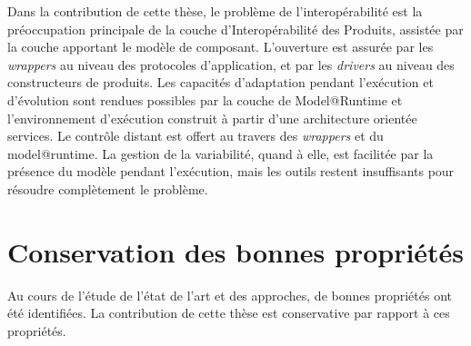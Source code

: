 Dans la contribution de cette thèse, le problème de l'interopérabilité est la préoccupation principale de la couche d'Interopérabilité des Produits, assistée par la couche apportant le modèle de composant. L'ouverture est assurée par les {\it wrappers} au niveau des protocoles d'application, et par les {\it drivers} au niveau des constructeurs de produits. Les capacités d'adaptation pendant l'exécution et d'évolution sont rendues possibles par la couche de Model@Runtime et l'environnement d'exécution construit à partir d'une architecture orientée services. Le contrôle distant est offert au travers des {\it wrappers} et du model@runtime. La gestion de la variabilité, quand à elle, est facilitée par la présence du modèle pendant l'exécution, mais les outils restent insuffisants pour résoudre complètement le problème.

\section{Conservation des bonnes propriétés}

Au cours de l'étude de l'état de l'art et des approches, de bonnes propriétés ont été identifiées. La contribution de cette thèse est conservative par rapport à ces propriétés.\\

